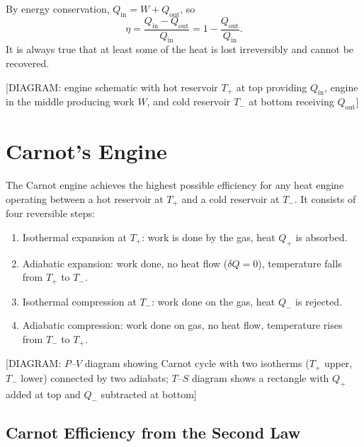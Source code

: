 By energy conservation, $Q_\text{in} = W + Q_\text{out}$, so
\begin{equation}
    \eta = \frac{Q_\text{in} - Q_\text{out}}{Q_\text{in}} = 1 - \frac{Q_\text{out}}{Q_\text{in}}.
\end{equation}
It is always true that at least some of the heat is lost irreversibly and cannot be recovered.

\begin{center}[DIAGRAM: engine schematic with hot reservoir $T_+$ at top providing $Q_\text{in}$, engine in the middle producing work $W$, and cold reservoir $T_-$ at bottom receiving $Q_\text{out}$]\end{center}

\section{Carnot's Engine}

\begin{definition}
The Carnot engine achieves the highest possible efficiency for any heat engine operating between a hot reservoir at $T_+$ and a cold reservoir at $T_-$. It consists of four reversible steps:
\begin{enumerate}
    \item Isothermal expansion at $T_+$: work is done by the gas, heat $Q_+$ is absorbed.
    \item Adiabatic expansion: work done, no heat flow ($\delta Q = 0$), temperature falls from $T_+$ to $T_-$.
    \item Isothermal compression at $T_-$: work done on the gas, heat $Q_-$ is rejected.
    \item Adiabatic compression: work done on gas, no heat flow, temperature rises from $T_-$ to $T_+$.
\end{enumerate}
\end{definition}

\begin{center}[DIAGRAM: $P$--$V$ diagram showing Carnot cycle with two isotherms ($T_+$ upper, $T_-$ lower) connected by two adiabats; $T$--$S$ diagram shows a rectangle with $Q_+$ added at top and $Q_-$ subtracted at bottom]\end{center}

\subsection{Carnot Efficiency from the Second Law}

